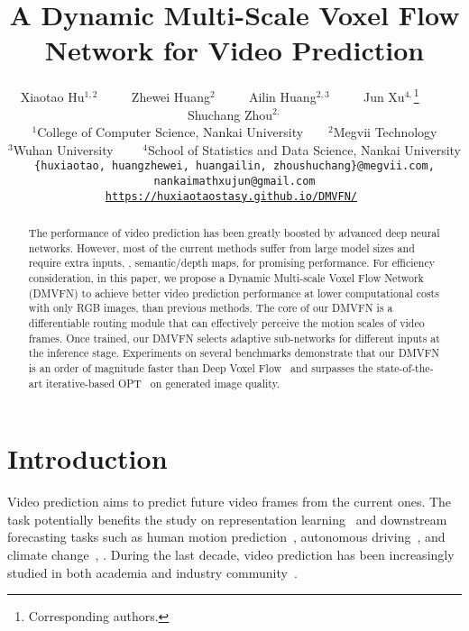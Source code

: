 \documentclass[10pt,twocolumn,letterpaper]{article}
\newcommand*\samethanks[1][\value{footnote}]{\footnotemark[#1]}
\begin{document}
\title{A Dynamic Multi-Scale Voxel Flow Network for Video Prediction}
\author{Xiaotao Hu$^{1,2}$
		~~~~
		Zhewei Huang$^{2}$
        ~~~~
		Ailin Huang$^{2,3}$
        ~~~~
            Jun Xu$^{4,}$\thanks{Corresponding authors.}
        ~~~~
            Shuchang Zhou$^{2,}$\samethanks{}\\
		$^{1}$College of Computer Science, Nankai University~~~~$^{2}$Megvii Technology\\ $^{3}$Wuhan University~~~~
        $^{4}$School of Statistics and Data Science, Nankai University\\
		{\tt\small \{huxiaotao, huangzhewei, huangailin, zhoushuchang\}@megvii.com}\tt\small, nankaimathxujun@gmail.com\\
  \url{https://huxiaotaostasy.github.io/DMVFN/}
	}
	\maketitle
 
\begin{abstract}
The performance of video prediction has been greatly boosted by advanced deep neural networks.
However, most of the current methods suffer from large model sizes and require extra inputs, \eg, semantic/depth maps, for promising performance.
For efficiency consideration, in this paper, we propose a Dynamic Multi-scale Voxel Flow Network (DMVFN) to achieve better video prediction performance at lower computational costs with only RGB images, than previous methods.
The core of our DMVFN is a differentiable routing module that can effectively perceive the motion scales of video frames.
Once trained, our DMVFN selects adaptive sub-networks for different inputs at the inference stage.
Experiments on several benchmarks demonstrate that our DMVFN is an order of magnitude faster than Deep Voxel Flow~\cite{dvf} and surpasses the state-of-the-art iterative-based OPT~\cite{wu2022optimizing} on generated image quality.
\end{abstract}
\section{Introduction}

Video prediction aims to predict future video frames from the current ones. The task potentially benefits the study on representation learning~\cite{oprea2020review} and downstream forecasting tasks such as human motion prediction~\cite{martinez2017human}, autonomous driving~\cite{castrejon2019improved}, and climate change~\cite{shi2015convolutional}, \etc. During the last decade, video prediction has been increasingly studied in both academia and industry community~\cite{chandra2019traphic,byeon2018contextvp}.
\end{document}
